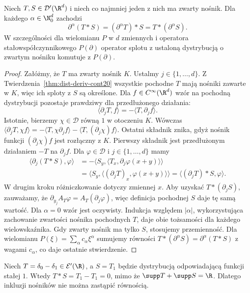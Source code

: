 \begin{twierdzenie}
\label{thm:convolution-derivative21}
Niech $T,S\in\mathcal D'(\R^d)$ i niech co najmniej
jeden z nich ma zwarty nośnik. Dla każdego
$\alpha\in\N_0^d$ zachodzi
\[
 \partial^\alpha(T*S)
 =(\partial^\alpha T)*S
 =T*(\partial^\alpha S).
\]
W szczególności dla wielomianu $P$ w $d$ zmiennych
i operatora stałowspółczynnikowego $P(\partial)$
operator splotu z ustaloną dystrybucją o zwartym
nośniku komutuje z $P(\partial)$.
\end{twierdzenie}
\begin{proof}
Załóżmy, że $T$ ma zwarty nośnik $K$. Ustalmy
$j\in\{1,\ldots,d\}$.
Z Twierdzenia~\ref{thm:dist-deriv-cont20} wszystkie
pochodne $T$ mają nośniki zawarte w $K$, więc ich sploty
z $S$ są określone. Dla $f\in C^\infty(\R^d)$
wzór na pochodną dystrybucji pozostaje prawdziwy
dla przedłużonego działania:
\[
 \langle\partial_jT,f\rangle
 =-\langle T,\partial_jf\rangle.
\]
Istotnie, bierzemy $\chi\in\mathcal D$ równą $1$
w otoczeniu $K$. Wówczas
$\langle\partial_jT,\chi f\rangle
=-\langle T,\chi\partial_jf\rangle
-\langle T,(\partial_j\chi)f\rangle$.
Ostatni składnik znika, gdyż nośnik funkcji
$(\partial_j\chi)f$ jest rozłączny z $K$.
Pierwszy składnik jest przedłużonym działaniem
$-T$ na $\partial_jf$. Dla
$\varphi\in\mathcal D$ i $j\in\{1,\ldots,d\}$ mamy
\[
 \begin{aligned}
 \langle\partial_j(T*S),\varphi\rangle
 &=-\langle S_y,\langle T_x,\partial_j\varphi(x+y)\rangle\rangle\\
 &=\langle S_y,\langle(\partial_jT)_x,\varphi(x+y)\rangle\rangle
 =\langle(\partial_jT)*S,\varphi\rangle.
 \end{aligned}
\]
W drugim kroku różniczkowanie dotyczy zmiennej $x$.
Aby uzyskać $T*(\partial_jS)$, zauważamy, że
$\partial_{y_j}A_T\varphi=A_T(\partial_j\varphi)$,
więc definicja pochodnej $S$ daje tę samą wartość.
Dla $\alpha=0$ wzór jest oczywisty. Indukcja względem
$|\alpha|$, wykorzystująca zachowanie zwartości nośnika
pochodnych $T$, daje obie tożsamości dla każdego
wielowskaźnika. Gdy zwarty nośnik ma tylko $S$,
stosujemy przemienność. Dla wielomianu
$P(\xi)=\sum_\alpha c_\alpha\xi^\alpha$ sumujemy
równości $T*(\partial^\alpha S)=\partial^\alpha(T*S)$
z wagami $c_\alpha$, co daje ostatnie stwierdzenie.
\end{proof}

\begin{przyklad}
\label{ex:support-strict21}
Niech $T=\delta_0-\delta_1\in\mathcal E'(\R)$,
a $S=T_1$ będzie dystrybucją odpowiadającą funkcji
stałej $1$. Wtedy $T*S=T_1-T_1=0$,
mimo że $\supp T+\supp S=\R$. Dlatego
inkluzji nośników nie można zastąpić równością.
\end{przyklad}

